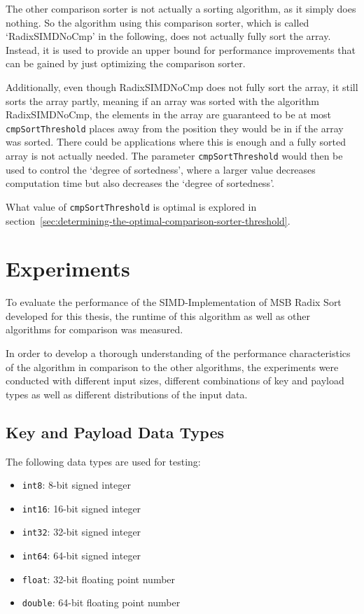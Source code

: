 \documentclass[12pt, a4paper, openright, twoside]{tiarbeit}
\begin{document}
The other comparison sorter is not actually a sorting algorithm,
as it simply does nothing. So the algorithm using this comparison sorter,
which is called `RadixSIMDNoCmp' in the following, does not actually fully sort
the array.
Instead, it is used to provide an upper bound
for performance improvements that can be gained by just
optimizing the comparison sorter.

Additionally, even though RadixSIMDNoCmp does not fully
sort the array, it still sorts the array partly, meaning
if an array was sorted with the algorithm RadixSIMDNoCmp,
the elements in the array are guaranteed to be at most
\texttt{cmpSortThreshold} places away from the position
they would be in if the array was sorted.
There could be applications where this is enough and a fully
sorted array is not actually needed.
The parameter \texttt{cmpSortThreshold} would then be used
to control the `degree of sortedness', where a larger value
decreases computation time but also decreases the `degree of
sortedness'.

What value of \texttt{cmpSortThreshold} is optimal is explored in
section~\ref{sec:determining-the-optimal-comparison-sorter-threshold}.


\chapter{Experiments}\label{chap:experiments}

To evaluate the performance of the SIMD-Implementation of MSB Radix Sort developed
for this thesis, the runtime of this algorithm as well as other algorithms for
comparison was measured.

In order to develop a thorough understanding of the performance characteristics of the
algorithm in comparison to the other algorithms, the experiments were conducted
with different input sizes, different combinations of key and payload types
as well as different distributions of the input data.

\section{Key and Payload Data Types}

The following data types are used for testing:
\begin{itemize}
  \setlength\itemsep{0em}
  \item \texttt{int8}: 8-bit signed integer
  \item \texttt{int16}: 16-bit signed integer
  \item \texttt{int32}: 32-bit signed integer
  \item \texttt{int64}: 64-bit signed integer
  \item \texttt{float}: 32-bit floating point number
  \item \texttt{double}: 64-bit floating point number
\end{itemize}
\end{document}
